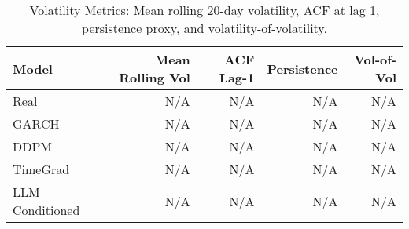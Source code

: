 \begin{table}[htbp]
\centering
\begin{tabular}{lrrrr}
\toprule
Model & Mean Rolling Vol & ACF Lag-1 & Persistence & Vol-of-Vol \\
\midrule
Real & N/A & N/A & N/A & N/A \\
GARCH & N/A & N/A & N/A & N/A \\
DDPM & N/A & N/A & N/A & N/A \\
TimeGrad & N/A & N/A & N/A & N/A \\
LLM-Conditioned & N/A & N/A & N/A & N/A \\
\bottomrule
\end{tabular}
\caption{Volatility Metrics: Mean rolling 20-day volatility, ACF at lag 1, persistence proxy, and volatility-of-volatility.}
\label{tab:volatility_metrics}
\end{table}